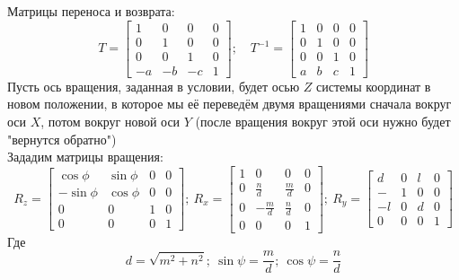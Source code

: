 \documentclass[a4paper, 14pt]{extarticle}
\begin{document}
Матрицы переноса и возврата:
$$
T=\begin{bmatrix}
1 & 0 & 0 & 0\\
0 & 1 & 0 & 0\\
0 & 0 & 1 & 0\\
-a & -b & -c & 1
\end{bmatrix}; \quad
T^{-1} = \begin{bmatrix}
1 & 0 & 0 & 0\\
0 & 1 & 0 & 0\\
0 & 0 & 1 & 0\\
a & b & c & 1
\end{bmatrix}
$$
Пусть ось вращения, заданная в условии, будет осью $Z$ системы координат в новом положении, в которое мы её переведём двумя вращениями сначала вокруг оси $X$, потом вокруг новой оси $Y$ (после вращения вокруг этой оси нужно будет "вернутся обратно")\\
Зададим матрицы вращения:
$$
R_z = \begin{bmatrix}
\cos{\phi} & \sin{\phi} & 0 & 0\\
-\sin{\phi} & \cos{\phi} & 0 & 0\\
0 & 0 & 1 & 0\\
0 & 0 & 0 & 1
\end{bmatrix}; \
R_x = \begin{bmatrix}
1 & 0 & 0 & 0\\
0 & \frac{n}{d} & \frac{m}{d} & 0\\
0 & -\frac{m}{d} & \frac{n}{d} & 0\\
0 & 0 & 0 & 1
\end{bmatrix}; \ 
R_y = \begin{bmatrix}
d & 0 & l & 0\\
- & 1 & 0 & 0\\
-l & 0 & d & 0\\
0 & 0 & 0 & 1
\end{bmatrix}
$$
Где
$$d=\sqrt{m^2+n^2}; \ \sin{\psi} = \dfrac{m}{d}; \ \cos{\psi} = \dfrac{n}{d}$$
\end{document}

